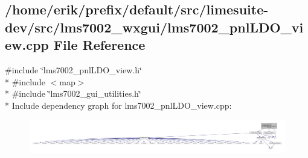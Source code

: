 \subsection{/home/erik/prefix/default/src/limesuite-\/dev/src/lms7002\+\_\+wxgui/lms7002\+\_\+pnl\+L\+D\+O\+\_\+view.cpp File Reference}
\label{lms7002__pnlLDO__view_8cpp}
{\ttfamily \#include \char`\"{}lms7002\+\_\+pnl\+L\+D\+O\+\_\+view.\+h\char`\"{}}\\*
{\ttfamily \#include $<$map$>$}\\*
{\ttfamily \#include \char`\"{}lms7002\+\_\+gui\+\_\+utilities.\+h\char`\"{}}\\*
Include dependency graph for lms7002\+\_\+pnl\+L\+D\+O\+\_\+view.\+cpp\+:
\nopagebreak
\begin{figure}[H]
\begin{center}
\leavevmode
\includegraphics[width=350pt]{dc/d2a/lms7002__pnlLDO__view_8cpp__incl}
\end{center}
\end{figure}
